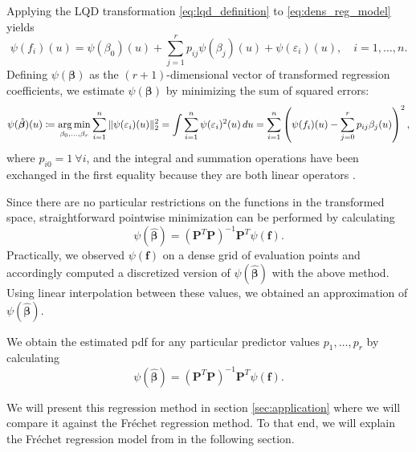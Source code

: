 Applying the LQD transformation \eqref{eq:lqd_definition} to \eqref{eq:dens_reg_model}
yields
\begin{equation}
    \label{eq:lqd_reg_model}
    \psi(f_i)(u) = \psi(\beta_0)(u) + \sum_{j=1}^{r} p_{ij} \psi(\beta_j)(u) + \psi(\varepsilon_i)(u), \quad i = 1, \ldots, n.
\end{equation}
Defining $\psi(\boldsymbol{\beta})$ as the $(r+1)$-dimensional vector of transformed
regression coefficients, we estimate $\psi(\boldsymbol{\beta})$ by minimizing the sum of
squared errors:
\begin{equation}
    \psi(\hat{\boldsymbol{\beta}})(u)
    \coloneqq \operatorname*{arg\,min}_{\beta_0,\dots, \beta_r} \sum_{i=1}^{n} \|\psi(\varepsilon_i) (u)\|_2^2
    = \int \sum_{i=1}^{n} \psi(\varepsilon_i)^2 (u) \, du
    = \sum_{i=1}^{n} \left( \psi(f_i)(u) - \sum_{j=0}^{r} p_{ij} \beta_j(u) \right)^2,
\end{equation}
where $p_{i0} = 1 \ \forall i$, and the integral and summation operations have been
exchanged in the first equality because they are both linear operators
\parencites[cf.][Chapter~13.4]{RamsaySilverman2005}[][Chapter~5.1]{KokoszkaReimherr2017}.

Since there are no particular restrictions on the functions in the transformed space,
straightforward pointwise minimization can be performed by calculating
\begin{equation}
    \psi(\hat{\boldsymbol{\beta}})
    = \left(\mathbf{P}^T \mathbf{P}\right)^{-1} \mathbf{P}^T \psi(\mathbf{f}).
\end{equation}
Practically, we observed $\psi(\mathbf{f})$ on a dense grid of evaluation points and
accordingly computed a discretized version of $\psi(\hat{\boldsymbol{\beta}})$ with the
above method. Using linear interpolation between these values, we obtained an approximation
of $\psi(\hat{\boldsymbol{\beta}})$.

We obtain the estimated pdf for any particular predictor values $p_1, \dots, p_r$ by
calculating
\begin{equation}
    \psi(\hat{\boldsymbol{\beta}})
    = \left(\mathbf{P}^T \mathbf{P}\right)^{-1} \mathbf{P}^T \psi(\mathbf{f}).
\end{equation}

We will present this regression method in section \ref{sec:application} where we will
compare it against the Fréchet regression method. To that end, we will explain the
Fréchet regression model from \textcite{PetersenMüller2019} in the following section.
